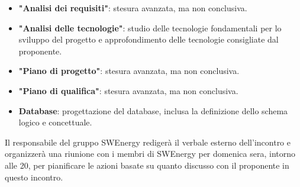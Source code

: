\begin{itemize}
	\item \textbf{"Analisi dei requisiti"}: stesura avanzata, ma non conclusiva.
    
    \item \textbf{"Analisi delle tecnologie"}: studio delle tecnologie 
		fondamentali per lo sviluppo del progetto e approfondimento delle 
		tecnologie consigliate dal proponente.
    
    \item \textbf{"Piano di progetto"}: stesura avanzata, ma non conclusiva.
    
    \item \textbf{"Piano di qualifica"}: stesura avanzata, ma non conclusiva.

    \item \textbf{Database}: progettazione del database, inclusa la 
		definizione dello schema logico e concettuale.
\end{itemize}

Il responsabile del gruppo SWEnergy redigerà il verbale esterno dell'incontro 
e organizzerà una riunione con i membri di SWEnergy per domenica sera, intorno 
alle 20, per pianificare le azioni basate su quanto discusso con il proponente 
in questo incontro.
